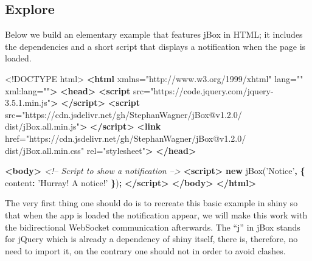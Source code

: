 \documentclass[10pt,]{krantz}
\makeatletter
\newenvironment{Shaded}{\begin{snugshade}}{\end{snugshade}}
\newcommand{\AttributeTok}[1]{\textcolor[rgb]{0.61,0.61,0.61}{#1}}
\newcommand{\CommentTok}[1]{\textcolor[rgb]{0.37,0.37,0.37}{\textit{#1}}}
\newcommand{\DataTypeTok}[1]{\textcolor[rgb]{0.27,0.27,0.27}{#1}}
\newcommand{\KeywordTok}[1]{\textcolor[rgb]{0.27,0.27,0.27}{\textbf{#1}}}
\newcommand{\NormalTok}[1]{#1}
\newcommand{\OperatorTok}[1]{\textcolor[rgb]{0.43,0.43,0.43}{\textbf{#1}}}
\newcommand{\OtherTok}[1]{\textcolor[rgb]{0.37,0.37,0.37}{#1}}
\newcommand{\StringTok}[1]{\textcolor[rgb]{0.5,0.5,0.5}{#1}}
\newenvironment{kframe}{%
\medskip{}
\setlength{\fboxsep}{.8em}
 \def\at@end@of@kframe{}%
 \ifinner\ifhmode%
  \def\at@end@of@kframe{\end{minipage}}%
  \begin{minipage}{\columnwidth}%
 \fi\fi%
 \def\FrameCommand##1{\hskip\@totalleftmargin \hskip-\fboxsep
 \colorbox{shadecolor}{##1}\hskip-\fboxsep
     \hskip-\linewidth \hskip-\@totalleftmargin \hskip\columnwidth}%
 \MakeFramed {\advance\hsize-\width
   \@totalleftmargin\z@ \linewidth\hsize
   \@setminipage}}%
 {\par\unskip\endMakeFramed%
 \at@end@of@kframe}
\renewenvironment{Shaded}{\begin{kframe}}{\end{kframe}}
\makeatother
\begin{document}
\hypertarget{shiny-intro-explore}{%
\subsection{Explore}\label{shiny-intro-explore}}

Below we build an elementary example that features jBox in HTML; it includes the dependencies and a short script that displays a notification when the page is loaded.

\begin{Shaded}
\begin{Highlighting}[]
\DataTypeTok{<!DOCTYPE }\NormalTok{html}\DataTypeTok{>}
\KeywordTok{<html}\OtherTok{ xmlns=}\StringTok{"http://www.w3.org/1999/xhtml"}\OtherTok{ lang=}\StringTok{""}\OtherTok{ xml:lang=}\StringTok{""}\KeywordTok{>}
\KeywordTok{<head>}
\KeywordTok{<script} 
\OtherTok{  src=}\StringTok{"https://code.jquery.com/jquery-3.5.1.min.js"}\KeywordTok{>}
  \KeywordTok{</script>}
\KeywordTok{<script} 
\OtherTok{  src=}\StringTok{"https://cdn.jsdelivr.net/gh/StephanWagner/jBox@v1.2.0/}
\StringTok{    dist/jBox.all.min.js"}\KeywordTok{>}
\KeywordTok{</script>}
\KeywordTok{<link} 
\OtherTok{  href=}\StringTok{"https://cdn.jsdelivr.net/gh/StephanWagner/jBox@v1.2.0/}
\StringTok{    dist/jBox.all.min.css"} 
\OtherTok{  rel=}\StringTok{"stylesheet"}\KeywordTok{>}
\KeywordTok{</head>}

\KeywordTok{<body>}
  \CommentTok{<!-- Script to show a notification -->}
  \KeywordTok{<script>}
    \KeywordTok{new} \AttributeTok{jBox}\NormalTok{(}\StringTok{'Notice'}\OperatorTok{,} \OperatorTok{\{}
      \DataTypeTok{content}\OperatorTok{:} \StringTok{'Hurray! A notice!'}
    \OperatorTok{\}}\NormalTok{)}\OperatorTok{;}
  \KeywordTok{</script>}
\KeywordTok{</body>}
\KeywordTok{</html>}
\end{Highlighting}
\end{Shaded}

The very first thing one should do is to recreate this basic example in shiny so that when the app is loaded the notification appear, we will make this work with the bidirectional WebSocket communication afterwards. The ``j'' in jBox stands for jQuery which is already a dependency of shiny itself, there is, therefore, no need to import it, on the contrary one should not in order to avoid clashes.
\end{document}
